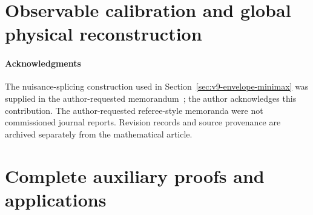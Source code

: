 \part{Observable calibration and global physical reconstruction}





\subsection*{Acknowledgments}
The nuisance-splicing construction used in
Section~\ref{sec:v9-envelope-minimax} was supplied in the
author-requested memorandum~\cite{A2ReviewV8}; the author acknowledges
this contribution.  The author-requested referee-style memoranda were
not commissioned journal reports.  Revision records and source
provenance are archived separately from the mathematical article.

\appendix
\renewcommand{\thesection}{A.\arabic{section}}
\renewcommand{\theHsection}{appendix.\arabic{section}}
\part{Complete auxiliary proofs and applications}



